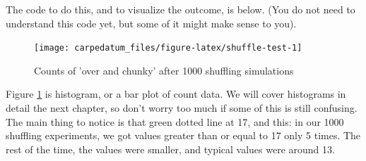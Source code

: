 \documentclass[openany]{book}
\newenvironment{Shaded}{\begin{snugshade}}{\end{snugshade}}
\newcommand{\CommentTok}[1]{\textcolor[rgb]{0.56,0.35,0.01}{\textit{#1}}}
\newcommand{\ControlFlowTok}[1]{\textcolor[rgb]{0.13,0.29,0.53}{\textbf{#1}}}
\newcommand{\DataTypeTok}[1]{\textcolor[rgb]{0.13,0.29,0.53}{#1}}
\newcommand{\DecValTok}[1]{\textcolor[rgb]{0.00,0.00,0.81}{#1}}
\newcommand{\KeywordTok}[1]{\textcolor[rgb]{0.13,0.29,0.53}{\textbf{#1}}}
\newcommand{\NormalTok}[1]{#1}
\newcommand{\OperatorTok}[1]{\textcolor[rgb]{0.81,0.36,0.00}{\textbf{#1}}}
\newcommand{\StringTok}[1]{\textcolor[rgb]{0.31,0.60,0.02}{#1}}
\begin{document}
The code to do this, and to visualize the outcome, is below. (You do not need to understand this code yet, but some of it might make sense to you).

\begin{Shaded}
\end{Shaded}

\begin{figure}

{\centering \texttt{[image: carpedatum\_files/figure-latex/shuffle-test-1]} 

}

\caption{Counts of 'over and chunky' after 1000 shuffling simulations}\label{fig:shuffle-test}
\end{figure}

Figure \ref{fig:shuffle-test} is histogram, or a bar plot of count data. We will cover histograms in detail the next chapter, so don't worry too much if some of this is still confusing. The main thing to notice is that green dotted line at 17, and this: in our 1000 shuffling experiments, we got values greater than or equal to 17 only 5 times. The rest of the time, the values were smaller, and typical values were around 13.
\end{document}
